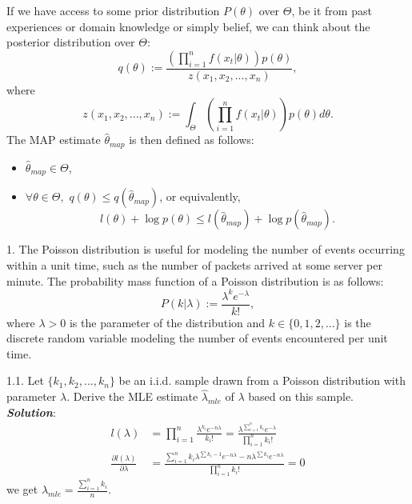 \documentclass{article}
\theoremstyle{definition}
\theoremstyle{definition}
\theoremstyle{remark}
\begin{document}
If we have access to some prior distribution $P(\theta)$ over $\Theta$, be it from past experiences or domain knowledge
or simply belief, we can think about the posterior distribution over $\Theta$:
\[
q(\theta):=\frac{\left(\prod_{i=1}^nf(x_t|\theta)\right)p(\theta)}{z(x_1,x_2,...,x_n)},
\]
where
\[
z(x_1,x_2,...,x_n):=\int_\Theta \left(\prod_{i=1}^nf(x_t|\theta)\right)p(\theta) d\theta.
\]
The MAP estimate $\hat{\theta}_{map}$ is then defined as follows:
\begin{itemize}
  \item $\hat{\theta}_{map}\in \Theta$,
  \item $\forall \theta \in \Theta,$ $q(\theta)\leq q(\hat{\theta}_{map})$, or equivalently,
  \[
  l(\theta)+\log p(\theta) \leq l(\hat{\theta}_{map}) + \log p(\hat{\theta}_{map}).
  \]
\end{itemize}

1. The Poisson distribution is useful for modeling the number of events occurring within a unit time, such
as the number of packets arrived at some server per minute. The probability mass function of a Poisson
distribution is as follows:
\[
P(k|\lambda):= \frac{\lambda^k e^{-\lambda}}{k!},
\]
where $\lambda > 0$ is the parameter of the distribution and $k\in\{0,1,2,...\}$ is the discrete random variable modeling
the number of events encountered per unit time.

1.1. Let $\{k_1,k_2,...,k_n\}$ be an i.i.d. sample drawn from a Poisson distribution with parameter $\lambda$. Derive the MLE estimate $\hat{\lambda}_{mle}$
of $\lambda$ based on this sample.\\
\emph{\textbf{Solution}}:\\
\begin{equation}\nonumber
\begin{aligned}
l(\lambda)&=\prod\limits_{i=1}^{n}\frac{\lambda^{k_i} e^{-n\lambda}}{k_i!}=\frac{\lambda^{\sum\limits_{i=1}^n k_i} e^{-\lambda}}{\prod\limits_{i=1}^{n}k_i!}\\
\frac{\partial l(\lambda)}{\partial \lambda}&=\frac{\sum\limits_{i=1}^n k_i\lambda^{\sum k_i - 1} e^{-n\lambda}-n\lambda^{\sum k_i} e^{-n\lambda}}{\prod\limits_{i=1}^{n}k_i!}=0
\end{aligned}
\end{equation}
we get $\hat{\lambda}_{mle} = \frac{\sum\limits_{i=1}^n k_i}{n}$.
\end{document}
